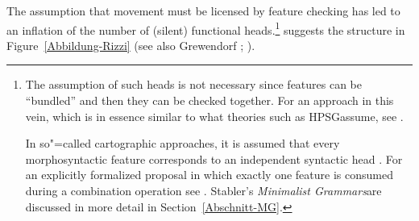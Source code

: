 The assumption that movement must be licensed by feature checking has led to an inflation of the number of (silent) functional 
heads.\footnote{%
	The assumption of such heads is not necessary since features can be ``bundled'' and then they
        can be checked together. For an approach in this vein,
	which is in essence similar to what theories such as HPSG\indexhpsg assume, see .

In so"=called cartographic approaches, it is assumed that every morphosyntactic feature corresponds to an independent syntactic
head \citep[, 61]{CR2010a}. For an explicitly formalized proposal in which exactly one
feature is consumed during a combination operation see . Stabler's \emph{Minimalist
    Grammars}\indexmg are discussed in more detail in Section~\ref{Abschnitt-MG}.
} 
\citet[]{Rizzi97a-u} suggests the structure in Figure~\vref{Abbildung-Rizzi} (see also
Grewendorf \citeyear[, 240]{Grewendorf2002a}; \citeyear{Grewendorf2009a}).

